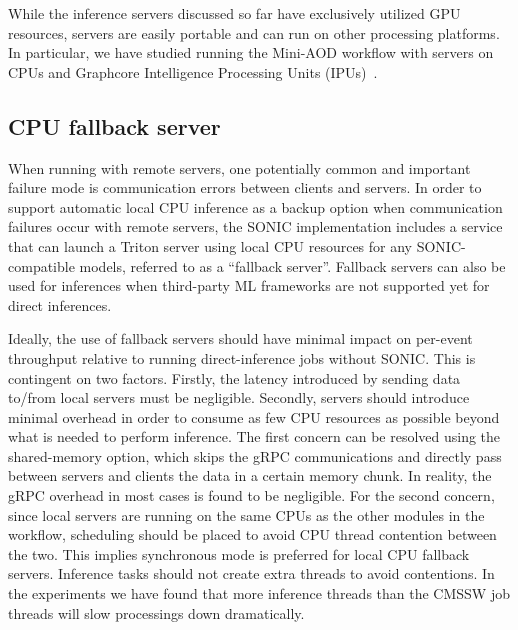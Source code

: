 While the inference servers discussed so far have exclusively utilized GPU resources, servers are easily portable and can run on other processing platforms. In particular, we have studied running the Mini-AOD workflow with servers on CPUs and Graphcore Intelligence Processing Units (IPUs)~\cite{Graphcore}.

\subsection{CPU fallback server}
\label{sec:fallback}
When running with remote servers, one potentially common and important failure mode is communication errors between clients and servers. In order to support automatic local CPU inference as a backup option when communication failures occur with remote servers, the SONIC implementation includes a service that can launch a Triton server using local CPU resources for any SONIC-compatible models, referred to as a ``fallback server''. Fallback servers can also be used for inferences when third-party ML frameworks are not supported yet for direct inferences. 

Ideally, the use of fallback servers should have minimal impact on per-event throughput relative to running direct-inference jobs without SONIC. This is contingent on two factors. Firstly, the latency introduced by sending data to/from local servers must be negligible. Secondly, servers should introduce minimal overhead in order to consume as few CPU resources as possible beyond what is needed to perform inference. The first concern can be resolved using the shared-memory option, which skips the gRPC communications and directly pass between servers and clients the data in a certain memory chunk. In reality, the gRPC overhead in most cases is found to be negligible. For the second concern, since local servers are running on the same CPUs as the other modules in the workflow, scheduling should be placed to avoid CPU thread contention between the two. This implies synchronous mode is preferred for local CPU fallback servers. Inference tasks should not create extra threads to avoid contentions. In the experiments we have found that more inference threads than the CMSSW job threads will slow processings down dramatically.

